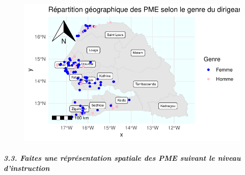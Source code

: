 \documentclass[
  letterpaper,
  DIV=11,
  numbers=noendperiod]{scrartcl}
\let\oldparagraph\paragraph
\renewcommand{\paragraph}[1]{\oldparagraph{#1}\mbox{}}
\begin{document}
\begin{figure}[H]

{\centering \includegraphics{projet_R_files/figure-pdf/unnamed-chunk-39-1.pdf}

}

\end{figure}

\hypertarget{faites-une-ruxe9pruxe9sentation-spatiale-des-pme-suivant-le-niveau-dinstruction}{%
\paragraph{\texorpdfstring{\emph{3.3. Faites une réprésentation spatiale
des PME suivant le niveau
d'instruction}}{3.3. Faites une réprésentation spatiale des PME suivant le niveau d'instruction}}\label{faites-une-ruxe9pruxe9sentation-spatiale-des-pme-suivant-le-niveau-dinstruction}}
\end{document}
